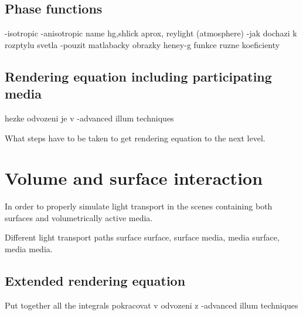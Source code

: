 \subsection{Phase functions}



-isotropic
-anisotropic name hg,shlick aprox, reylight (atmosphere)
-jak dochazi k rozptylu svetla
-pouzit matlabacky obrazky heney-g funkce ruzne koeficienty

\subsection{Rendering equation including participating media}
hezke odvozeni je v -advanced illum techniques

What steps have to be taken to get rendering equation to the next level.

\section{Volume and surface interaction}
In order to properly simulate light transport in the scenes containing both surfaces and volumetrically active media.

Different light transport paths surface surface, surface media, media surface, media media.

\subsection{Extended rendering equation}
Put together all the integrals
pokracovat v odvozeni z -advanced illum techniques






